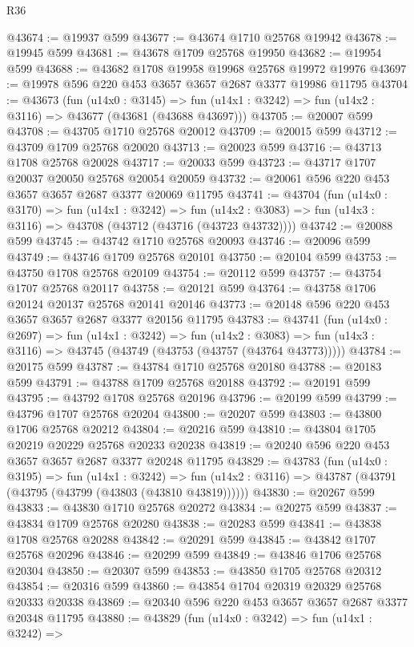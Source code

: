 \begin{lexlean}{R36}
\begin{coremodule}
@43674 := @19937 @599
@43677 := @43674 @1710 @25768 @19942
@43678 := @19945 @599
@43681 := @43678 @1709 @25768 @19950
@43682 := @19954 @599
@43688 := @43682 @1708 @19958 @19968 @25768 @19972 @19976
@43697 := @19978 @596 @220 @453 @3657 @3657 @2687 @3377 @19986 @11795
@43704 := @43673
    (fun (u14x0 : @3145) =>
    fun (u14x1 : @3242) => fun (u14x2 : @3116) => @43677 (@43681 (@43688 @43697)))
@43705 := @20007 @599
@43708 := @43705 @1710 @25768 @20012
@43709 := @20015 @599
@43712 := @43709 @1709 @25768 @20020
@43713 := @20023 @599
@43716 := @43713 @1708 @25768 @20028
@43717 := @20033 @599
@43723 := @43717 @1707 @20037 @20050 @25768 @20054 @20059
@43732 := @20061 @596 @220 @453 @3657 @3657 @2687 @3377 @20069 @11795
@43741 := @43704
    (fun (u14x0 : @3170) =>
    fun (u14x1 : @3242) =>
    fun (u14x2 : @3083) => fun (u14x3 : @3116) => @43708 (@43712 (@43716 (@43723 @43732))))
@43742 := @20088 @599
@43745 := @43742 @1710 @25768 @20093
@43746 := @20096 @599
@43749 := @43746 @1709 @25768 @20101
@43750 := @20104 @599
@43753 := @43750 @1708 @25768 @20109
@43754 := @20112 @599
@43757 := @43754 @1707 @25768 @20117
@43758 := @20121 @599
@43764 := @43758 @1706 @20124 @20137 @25768 @20141 @20146
@43773 := @20148 @596 @220 @453 @3657 @3657 @2687 @3377 @20156 @11795
@43783 := @43741
    (fun (u14x0 : @2697) =>
    fun (u14x1 : @3242) =>
    fun (u14x2 : @3083) => fun (u14x3 : @3116) => @43745 (@43749 (@43753 (@43757 (@43764 @43773)))))
@43784 := @20175 @599
@43787 := @43784 @1710 @25768 @20180
@43788 := @20183 @599
@43791 := @43788 @1709 @25768 @20188
@43792 := @20191 @599
@43795 := @43792 @1708 @25768 @20196
@43796 := @20199 @599
@43799 := @43796 @1707 @25768 @20204
@43800 := @20207 @599
@43803 := @43800 @1706 @25768 @20212
@43804 := @20216 @599
@43810 := @43804 @1705 @20219 @20229 @25768 @20233 @20238
@43819 := @20240 @596 @220 @453 @3657 @3657 @2687 @3377 @20248 @11795
@43829 := @43783
    (fun (u14x0 : @3195) =>
    fun (u14x1 : @3242) =>
    fun (u14x2 : @3116) => @43787 (@43791 (@43795 (@43799 (@43803 (@43810 @43819))))))
@43830 := @20267 @599
@43833 := @43830 @1710 @25768 @20272
@43834 := @20275 @599
@43837 := @43834 @1709 @25768 @20280
@43838 := @20283 @599
@43841 := @43838 @1708 @25768 @20288
@43842 := @20291 @599
@43845 := @43842 @1707 @25768 @20296
@43846 := @20299 @599
@43849 := @43846 @1706 @25768 @20304
@43850 := @20307 @599
@43853 := @43850 @1705 @25768 @20312
@43854 := @20316 @599
@43860 := @43854 @1704 @20319 @20329 @25768 @20333 @20338
@43869 := @20340 @596 @220 @453 @3657 @3657 @2687 @3377 @20348 @11795
@43880 := @43829
    (fun (u14x0 : @3242) =>
    fun (u14x1 : @3242) =>

\end{coremodule}
\end{lexlean}
